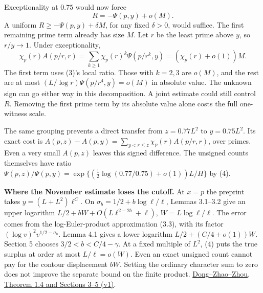 \documentclass[11pt]{article}
\newcommand{\ch}{\chi_p}
\newcommand{\DZZ}{\href{https://arxiv.org/pdf/2611.11389v1}{Dong--Zhao--Zhou, Theorem 1.4 and Sections 3--5 (v1)}}
\begin{document}
Exceptionality at \(0.75\) would now force
\[
 R=-\Psi(p,y)+o(M).
\]
A uniform
\(R\ge-\Psi(p,y)+\delta M\), for any fixed \(\delta>0\), would suffice.
The first remaining prime term already has size \(M\). Let \(r\) be the
least prime above \(y\), so \(r/y\to1\). Under exceptionality,
\begin{equation}
 \ch(r)A(p/r,r)=\sum_{k\ge1}\ch(r)^k\Psi(p/r^k,y)
              =(\ch(r)+o(1))M .
\end{equation}
The first term uses (3)'s local ratio. Those with \(k=2,3\) are \(o(M)\),
and the rest are at most \((L/\log r)\Psi(p/r^4,y)=o(M)\) in absolute
value. The unknown sign can go either way in this decomposition. A joint
estimate could still control \(R\). Removing the first prime term by its
absolute value alone costs the full one-witness scale.

The same grouping prevents a direct transfer from \(z=0.77L^2\) to
\(y=0.75L^2\). Its exact cost is
\(A(p,z)-A(p,y)=\sum_{y<r\le z}\ch(r)A(p/r,r)\), over primes.
Even a very small \(A(p,z)\) leaves this signed difference.
The unsigned counts themselves have ratio
\(\Psi(p,z)/\Psi(p,y)=\exp\{(\tfrac12\log(0.77/0.75)+o(1))L/H\}\)
by (4).

\textbf{Where the November estimate loses the cutoff.} At \(x=p\) the
preprint takes \(y=(L+L^2)\ell^C\). On
\(\sigma_b=1/2+b\log\ell/\ell\), Lemmas 3.1--3.2 give an upper logarithm
\(L/2+bW+O(L\ell^{2-2b}+\ell)\), \(W=L\log\ell/\ell\).
The error comes from the log-Euler-product approximation (3.3), with its
factor \((\log v)^2 v^{1/2-\sigma_b}\). Lemma 4.1 gives a lower logarithm
\(L/2+(C/4+o(1))W\). Section 5 chooses \(3/2<b<C/4-\gamma\).
At a fixed multiple of \(L^2\), (4) puts the true surplus at order at
most \(L/\ell=o(W)\). Even an exact unsigned count cannot pay for the
contour displacement \(bW\). Setting the ordinary character sum to zero
does not improve the separate bound on the finite product. \DZZ.

\newpage
\end{document}
